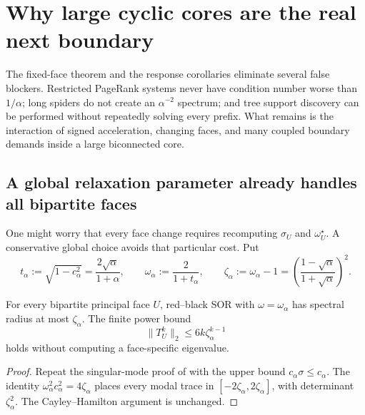 \section{Why large cyclic cores are the real next boundary}
\label{sec:beyond-bounded-blocks}

The fixed-face theorem and the response corollaries eliminate several false
blockers.  Restricted PageRank systems never have condition number worse than
$1/\alpha$; long spiders do not create an $\alpha^{-2}$ spectrum; and tree
support discovery can be performed without repeatedly solving every prefix.
What remains is the interaction of signed acceleration, changing faces, and
many coupled boundary demands inside a large biconnected core.

\subsection{A global relaxation parameter already handles all bipartite faces}

One might worry that every face change requires recomputing
$\sigma_U$ and $\omega_U^\star$.  A conservative global choice avoids that
particular cost.  Put
\begin{equation}
 t_\alpha:=\sqrt{1-c_\alpha^2}
 =\frac{2\sqrt\alpha}{1+\alpha},
 \qquad
 \omega_\alpha:=\frac2{1+t_\alpha},
 \qquad
 \zeta_\alpha:=\omega_\alpha-1
 =\left(\frac{1-\sqrt\alpha}{1+\sqrt\alpha}\right)^2.
 \label{eq:global-bipartite-omega}
\end{equation}

\begin{lemma}
\label{lem:one-omega-all-bipartite-faces}
For every bipartite principal face $U$, red--black SOR with
$\omega=\omega_\alpha$ has spectral radius at most $\zeta_\alpha$.  The
finite power bound
\begin{equation}
 \|T_U^k\|_2\leq6k\zeta_\alpha^{k-1}
 \label{eq:global-face-power-bound}
\end{equation}
holds without computing a face-specific eigenvalue.
\end{lemma}

\begin{proof}
Repeat the singular-mode proof of  with the
upper bound $c_\alpha\sigma\leq c_\alpha$.  The identity
$\omega_\alpha^2c_\alpha^2=4\zeta_\alpha$ places every modal trace in
$[-2\zeta_\alpha,2\zeta_\alpha]$, with determinant
$\zeta_\alpha^2$.  The Cayley--Hamilton argument is unchanged.
\end{proof}

